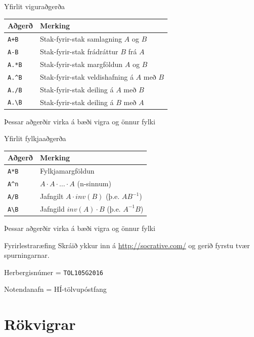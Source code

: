 \documentclass{beamer}
\begin{document}
\begin{frame}{Yfirlit viguraðgerða}
\begin{center}
\begin{tabular}{ll}
\toprule
Aðgerð&Merking\\
\midrule
\texttt{A+B}&Stak-fyrir-stak samlagning $A$ og $B$\\
\texttt{A-B}&Stak-fyrir-stak frádráttur $B$ frá $A$\\
\texttt{A.*B}&Stak-fyrir-stak margföldun $A$ og $B$\\
\texttt{A.\^{}B}&Stak-fyrir-stak veldishafning á $A$ með $B$\\
\texttt{A./B}&Stak-fyrir-stak deiling á $A$ með $B$\\
\texttt{A.\textbackslash B}&Stak-fyrir-stak deiling á $B$ með $A$\\
\bottomrule
\end{tabular}
\end{center}
Þessar aðgerðir virka á bæði vigra og önnur fylki
\end{frame}

\begin{frame}{Yfirlit fylkjaaðgerða}
\begin{center}
\begin{tabular}{ll}
\toprule
Aðgerð&Merking\\
\midrule
\texttt{A*B}&Fylkjamargföldun\\
\texttt{A\^{}n}&$A\cdot A\cdot \ldots \cdot A$ (n-sinnum)\\
\texttt{A/B}&Jafngilt  $A\cdot inv(B)$ (þ.e. $AB^{-1}$)\\
\texttt{A\textbackslash B}&Jafngild $inv(A)\cdot B$  (þ.e. $A^{-1}B$)\\
\bottomrule
\end{tabular}
\end{center}
Þessar aðgerðir virka á bæði vigra og önnur fylki
\end{frame}

\begin{frame}{Fyrirlestraræfing}
Skráið ykkur inn á \url{http://socrative.com/} og gerið fyrstu tvær spurningarnar.

Herbergisnúmer = \texttt{TOL105G2016}

Notendanafn = HÍ-tölvupóstfang
\end{frame}

\section{Rökvigrar}
\end{document}
